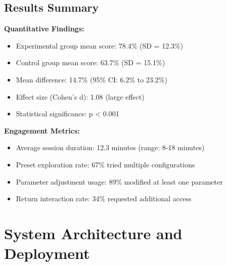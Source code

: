 \documentclass[12pt,journal,onecolumn]{IEEEtran}
\begin{document}
\subsection{Results Summary}

\textbf{Quantitative Findings:}
\begin{itemize}
\item Experimental group mean score: 78.4\% (SD = 12.3\%)
\item Control group mean score: 63.7\% (SD = 15.1\%)
\item Mean difference: 14.7\% (95\% CI: 6.2\% to 23.2\%)
\item Effect size (Cohen's d): 1.08 (large effect)
\item Statistical significance: p < 0.001
\end{itemize}

\textbf{Engagement Metrics:}
\begin{itemize}
\item Average session duration: 12.3 minutes (range: 8-18 minutes)
\item Preset exploration rate: 67\% tried multiple configurations
\item Parameter adjustment usage: 89\% modified at least one parameter
\item Return interaction rate: 34\% requested additional access
\end{itemize}

\section{System Architecture and Deployment}
\label{app:architecture}
\end{document}
